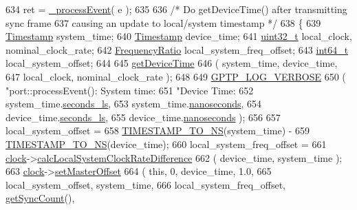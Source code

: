 \begin{DoxyCode}
634             ret = \hyperlink{class_common_port_a8fdf705ad3f9d8794555fe1c611c19ec}{\_processEvent}( e );
635 
636         \textcolor{comment}{/* Do getDeviceTime() after transmitting sync frame}
637 \textcolor{comment}{           causing an update to local/system timestamp */}
638         \{
639             \hyperlink{class_timestamp}{Timestamp} system\_time;
640             \hyperlink{class_timestamp}{Timestamp} device\_time;
641             \hyperlink{parse_8c_a6eb1e68cc391dd753bc8ce896dbb8315}{uint32\_t} local\_clock, nominal\_clock\_rate;
642             \hyperlink{ptptypes_8hpp_a84de47dc2ed889ecd2b61706d3ad0f2e}{FrequencyRatio} local\_system\_freq\_offset;
643             \hyperlink{parse_8c_a67a9885ef4908cb72ce26d75b694386c}{int64\_t} local\_system\_offset;
644 
645             \hyperlink{class_common_port_a16ab03ee31d5e246f05098d1e89f2537}{getDeviceTime}
646                 ( system\_time, device\_time,
647                   local\_clock, nominal\_clock\_rate );
648 
649             \hyperlink{gptp__log_8hpp_add03384a2a8099b27e07d041cce77e6f}{GPTP\_LOG\_VERBOSE}
650                 ( \textcolor{stringliteral}{"port::processEvent(): System time: %
651                   \textcolor{stringliteral}{"Device Time: %
652                   system\_time.\hyperlink{class_timestamp_a2bf200e58cd268d8b86cf93c51500a44}{seconds\_ls},
653                   system\_time.\hyperlink{class_timestamp_a78ae11d98fcfe738239d0a853d82c84a}{nanoseconds},
654                   device\_time.\hyperlink{class_timestamp_a2bf200e58cd268d8b86cf93c51500a44}{seconds\_ls},
655                   device\_time.\hyperlink{class_timestamp_a78ae11d98fcfe738239d0a853d82c84a}{nanoseconds} );
656 
657             local\_system\_offset =
658                 \hyperlink{ieee1588_8hpp_a0f6cecd8adce4a7314f084f3ead49999}{TIMESTAMP\_TO\_NS}(system\_time) -
659                 \hyperlink{ieee1588_8hpp_a0f6cecd8adce4a7314f084f3ead49999}{TIMESTAMP\_TO\_NS}(device\_time);
660             local\_system\_freq\_offset =
661                 \hyperlink{class_common_port_aa2bc8731fa5aeb5b033feebc2b67258c}{clock}->\hyperlink{class_i_e_e_e1588_clock_af78760f9002bfad5f7494c49907f91b9}{calcLocalSystemClockRateDifference}
662                 ( device\_time, system\_time );
663             \hyperlink{class_common_port_aa2bc8731fa5aeb5b033feebc2b67258c}{clock}->\hyperlink{class_i_e_e_e1588_clock_a6e4391235823b250e5dbf6df39b27476}{setMasterOffset}
664                 ( \textcolor{keyword}{this}, 0, device\_time, 1.0,
665                   local\_system\_offset, system\_time,
666                   local\_system\_freq\_offset, \hyperlink{class_common_port_ae83aa3b2d155e97810ccccd57e9f13ca}{getSyncCount}(),
}}
\end{DoxyCode}
